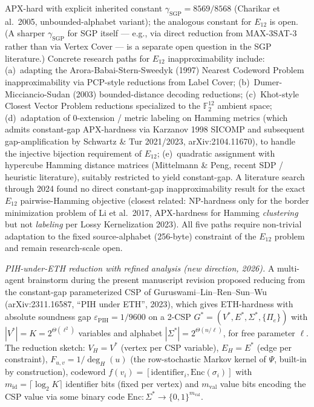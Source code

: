 \documentclass[
]{article}
\begin{document}
\begin{itemize}
  APX-hard with explicit inherited constant
  $\gamma_{\mathrm{SGP}} = 8569/8568$ (Charikar et al.\ 2005,
  unbounded-alphabet variant); the analogous constant for $E_{12}$
  is open. (A sharper $\gamma_{\mathrm{SGP}}$ for SGP itself ---
  e.g., via direct reduction from MAX-3SAT-3 rather than via Vertex
  Cover --- is a separate open question in the SGP literature.)
  Concrete research paths for $E_{12}$ inapproximability include:
  (a)~adapting the Arora-Babai-Stern-Sweedyk (1997) Nearest
  Codeword Problem inapproximability via PCP-style reductions from
  Label Cover; (b)~Dumer-Micciancio-Sudan (2003) bounded-distance
  decoding reductions; (c)~Khot-style Closest Vector Problem
  reductions specialized to the $\mathbb{F}_2^{12}$ ambient
  space; (d)~adaptation of $0$-extension / metric labeling on
  Hamming metrics (which admits constant-gap APX-hardness via
  Karzanov 1998 SICOMP and subsequent gap-amplification by
  Schwartz \& Tur 2021/2023, arXiv:2104.11670), to handle the
  injective bijection requirement of $E_{12}$; (e)~quadratic
  assignment with hypercube Hamming distance matrices (Mittelmann \&
  Peng, recent SDP / heuristic literature), suitably restricted to
  yield constant-gap. A literature search through 2024 found no
  direct constant-gap inapproximability result for the exact $E_{12}$
  pairwise-Hamming objective (closest related: NP-hardness only for
  the border minimization problem of Li et al.\ 2017, APX-hardness
  for Hamming \emph{clustering} but not \emph{labeling} per
  Lossy Kernelization 2023). All five paths require non-trivial
  adaptation to the fixed source-alphabet (256-byte) constraint of
  the $E_{12}$ problem and remain research-scale open.

  \emph{PIH-under-ETH reduction with refined analysis (new direction,
  2026).} A multi-agent brainstorm during the present manuscript
  revision proposed reducing from the constant-gap parameterized
  CSP of Guruswami--Lin--Ren--Sun--Wu (arXiv:2311.16587, ``PIH under
  ETH'', 2023), which gives ETH-hardness with absolute soundness gap
  $\varepsilon_{\mathrm{PIH}} = 1/9600$ on a 2-CSP $G^* = (V^*, E^*,
  \Sigma^*, \{\Pi_e\})$ with $|V^*| = K = 2^{\Theta(\ell^2)}$ variables
  and alphabet $|\Sigma^*| = 2^{\Theta(n/\ell)}$, for free parameter
  $\ell$. The reduction sketch: $V_H = V^*$ (vertex per CSP variable),
  $E_H = E^*$ (edge per constraint), $F_{u, v} = 1/\deg_H(u)$ (the
  row-stochastic Markov kernel of $\Psi$, built-in by construction),
  codeword $f(v_i) = [\mathrm{identifier}_i, \mathrm{Enc}(\sigma_i)]$
  with $m_{\mathrm{id}} = \lceil \log_2 K \rceil$ identifier bits
  (fixed per vertex) and $m_{\mathrm{val}}$ value bits encoding the
  CSP value via some binary code $\mathrm{Enc} : \Sigma^* \to
  \{0, 1\}^{m_{\mathrm{val}}}$.


\end{itemize}
\end{document}
